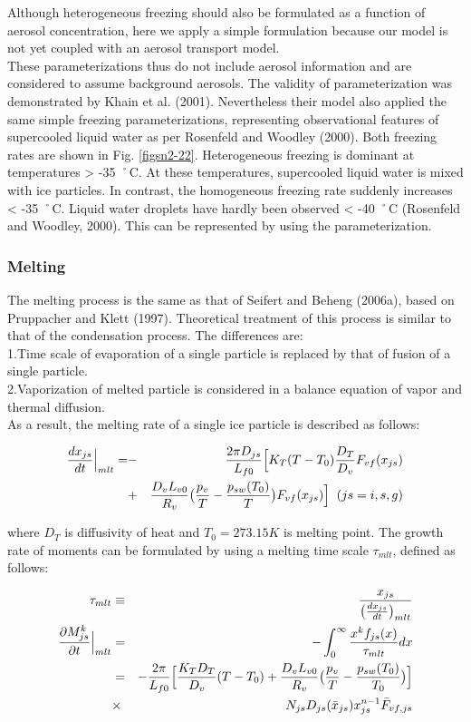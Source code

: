 Although heterogeneous freezing should also be formulated as a function of aerosol concentration, here we apply a simple formulation because our model is not yet coupled with an aerosol transport model.\\
These parameterizations thus do not include aerosol information and are considered to assume background aerosols. The validity of parameterization was demonstrated by Khain et al. (2001). Nevertheless their model also applied the same simple freezing parameterizations, representing observational features of supercooled liquid water as per Rosenfeld and Woodley (2000). Both freezing rates are shown in Fig. \ref{figsn2-22}. Heterogeneous freezing is dominant at temperatures > -35 ˚C. At these temperatures, supercooled liquid water is mixed with ice particles. In contrast, the homogeneous freezing rate suddenly increases < -35 ˚C. Liquid water droplets have hardly been observed < -40 ˚C (Rosenfeld and Woodley, 2000). This can be represented by using the parameterization.

\subsubsection{Melting}
The melting process is the same as that of Seifert and Beheng (2006a), based on Pruppacher and Klett (1997). Theoretical treatment of this process is similar to that of the condensation process. The differences are:\\
1.Time scale of evaporation of a single particle is replaced by that of fusion of a single particle.\\
2.Vaporization of melted particle is considered in a balance equation of vapor and thermal diffusion.\\
As a result, the melting rate of a single ice particle is described as follows:

\begin{eqnarray}
\frac{dx_{js}}{dt}\Bigr|_{mlt}=&-&\frac{2\pi D_{js}}{L_{f0}}\Bigl[K_{T}(T-T_{0})\frac{D_{T}}{D_{v}}F_{vf}(x_{js})\nonumber\\
&+&\frac{D_{v}L_{v0}}{R_{v}}\bigr(\frac{p_{v}}{T}-\frac{p_{sw}(T_{0})}{T}\bigr)F_{vf}(x_{js})\Bigr]\;\;(js=i,s,g)\label{sn128}
\end{eqnarray}

where $D_{T}$ is diffusivity of heat and $T_{0} = 273.15 K$ is melting point. The growth rate of moments can be formulated by using a melting time scale $\tau_{mlt}$, defined as follows:

\begin{eqnarray}
\tau_{mlt}&\equiv&\frac{x_{js}}{\bigl(\frac{dx_{js}}{dt}\bigr)_{mlt}}\label{sn129}\\
\frac{\partial M_{js}^{k}}{\partial t}\Bigr|_{mlt}&=&-\int_{0}^{\infty}\frac{x^{k}f_{js}(x)}{\tau_{mlt}}dx\nonumber\\
&=&-\frac{2\pi}{L_{f0}}\Bigl[\frac{K_{T}D_{T}}{D_{v}}(T-T_{0})+\frac{D_{v}L_{v0}}{R_{v}}\bigl(\frac{p_{v}}{T}-\frac{p_{sw}(T_{0})}{T_{0}}\bigr)\Bigr]\nonumber\\
&\times& N_{js}D_{js}(\bar{x}_{js})x_{js}^{n-1}\bar{F}_{vf,js}
\label{sn140}
\end{eqnarray}

